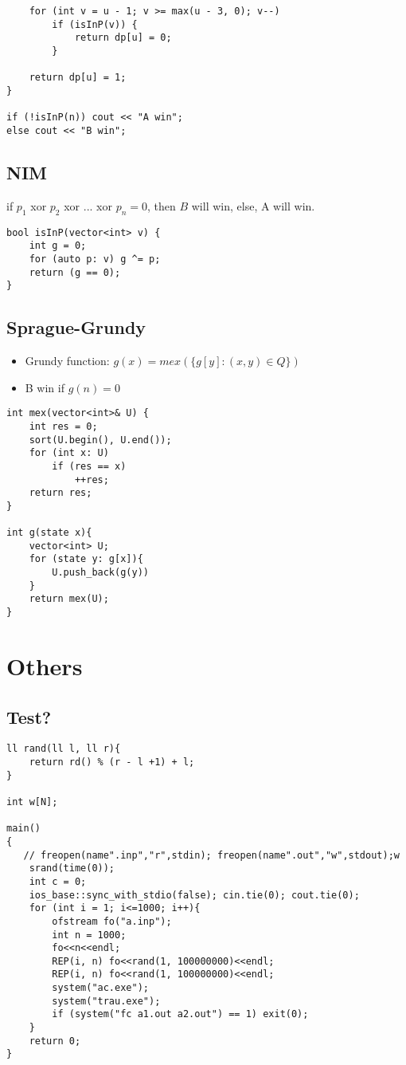 \documentclass[11pt,a4paper]{article}
\begin{document}
\begin{multicols*}{2}
\begin{lstlisting}
    for (int v = u - 1; v >= max(u - 3, 0); v--)
        if (isInP(v)) {
            return dp[u] = 0;
        }

    return dp[u] = 1;
}

if (!isInP(n)) cout << "A win";
else cout << "B win";

\end{lstlisting}
\subsection{NIM}
if $p_1$ xor $p_2$ xor ... xor $p_n = 0$, then $B$ will win, else, A will win.
\begin{lstlisting}
bool isInP(vector<int> v) {
    int g = 0;
    for (auto p: v) g ^= p;
    return (g == 0);
}
\end{lstlisting}
\subsection{Sprague-Grundy}

\begin{itemize}
    \item Grundy function: $g(x) = mex(\{g[y] : (x, y) \in Q\})$
    \item B win if $g(n) = 0$
\end{itemize}
\begin{lstlisting}
int mex(vector<int>& U) {
    int res = 0;
    sort(U.begin(), U.end());
    for (int x: U)
        if (res == x)
            ++res;
    return res;
}

int g(state x){
    vector<int> U;    
    for (state y: g[x]){
        U.push_back(g(y))
    }
    return mex(U);
}
\end{lstlisting}


\section{Others}
\subsection{Test?}
\begin{lstlisting}
ll rand(ll l, ll r){
    return rd() % (r - l +1) + l;
}

int w[N];

main()
{
   // freopen(name".inp","r",stdin); freopen(name".out","w",stdout);w
    srand(time(0));
    int c = 0;
    ios_base::sync_with_stdio(false); cin.tie(0); cout.tie(0);
    for (int i = 1; i<=1000; i++){
        ofstream fo("a.inp");
        int n = 1000;
        fo<<n<<endl;
        REP(i, n) fo<<rand(1, 100000000)<<endl;
        REP(i, n) fo<<rand(1, 100000000)<<endl;
        system("ac.exe");
        system("trau.exe");
        if (system("fc a1.out a2.out") == 1) exit(0);
    }
    return 0;
}


\end{lstlisting}
\end{multicols*}
\end{document}
